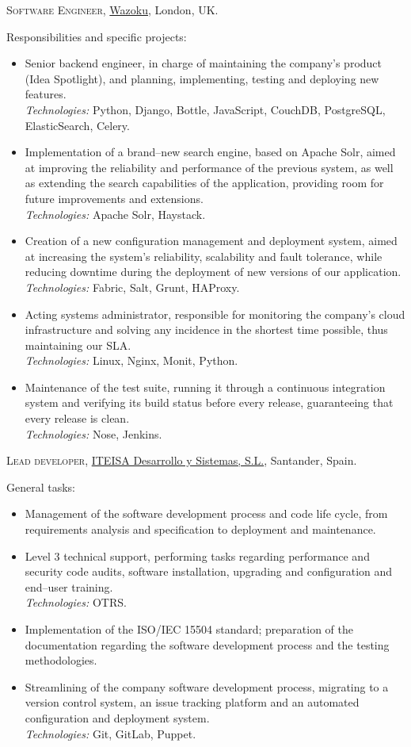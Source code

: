 \documentclass[11pt]{article}
\newcommand{\years}[1]{\marginnote{\scriptsize #1}}
\begin{document}
\years{2014}\textsc{Software Engineer}, \href{http://www.wazoku.com}{Wazoku}, London, UK.

Responsibilities and specific projects:
\begin{itemize}
	\item  Senior backend engineer, in charge of maintaining the company's product (Idea Spotlight), and planning, implementing, testing and deploying new features.\\
	\textit{Technologies:} Python, Django, Bottle, JavaScript, CouchDB, PostgreSQL, ElasticSearch, Celery.
	\item  Implementation of a brand--new search engine, based on Apache Solr, aimed at improving the reliability and performance of the previous system, as well as extending the search capabilities of the application, providing room for future improvements and extensions.\\
	\textit{Technologies:} Apache Solr, Haystack.
	\item  Creation of a new configuration management and deployment system, aimed at increasing the system's reliability, scalability and fault tolerance, while reducing downtime during the deployment of new versions of our application.\\
	\textit{Technologies:} Fabric, Salt, Grunt, HAProxy.
	\item  Acting systems administrator, responsible for monitoring the company's cloud infrastructure and solving any incidence in the shortest time possible, thus maintaining our SLA.\\
	\textit{Technologies:} Linux, Nginx, Monit, Python.
	\item  Maintenance of the test suite, running it through a continuous integration system and verifying its build status before every release, guaranteeing that every release is clean.\\
	\textit{Technologies:} Nose, Jenkins.
\end{itemize}

\years{2011--2013}\textsc{Lead developer}, \href{http://www.iteisa.com}{ITEISA Desarrollo y Sistemas, S.L.}, Santander, Spain.

General tasks:
\begin{itemize}
	\item  Management of the software development process and code life cycle, from requirements analysis and specification to deployment and maintenance.
	\item  Level 3 technical support, performing tasks regarding performance and security code audits, software installation, upgrading and configuration and end--user training.\\
	\textit{Technologies:} OTRS.
	\item  Implementation of the ISO/IEC 15504 standard; preparation of the documentation regarding the software development process and the testing methodologies.
	\item  Streamlining of the company software development process, migrating to a version control system, an issue tracking platform and an automated configuration and deployment system.\\
	\textit{Technologies:} Git, GitLab, Puppet.
\end{itemize}
\end{document}
